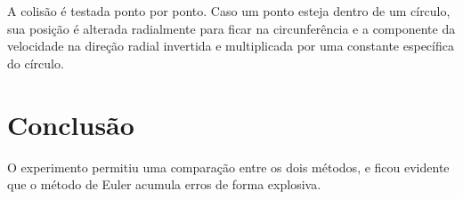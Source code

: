 \documentclass{article}
\begin{document}
A colisão é testada ponto por ponto. Caso um ponto esteja dentro de um círculo, sua posição é alterada radialmente para ficar na circunferência e a componente da velocidade na direção radial invertida e multiplicada por uma constante específica do círculo.

\section*{Conclusão}

O experimento permitiu uma comparação entre os dois métodos, e ficou evidente que o método de Euler acumula erros de forma explosiva.
\end{document}
